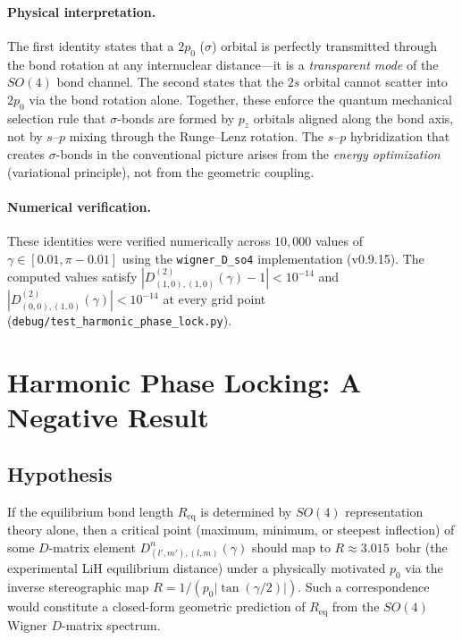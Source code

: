 \documentclass[aps,pra,twocolumn,superscriptaddress,longbibliography]{revtex4-2}
\begin{document}
\paragraph{Physical interpretation.}
The first identity states that a $2p_0$ ($\sigma$) orbital is perfectly
transmitted through the bond rotation at any internuclear distance---it is
a \emph{transparent mode} of the $SO(4)$ bond channel.  The second states
that the $2s$ orbital cannot scatter into $2p_0$ via the bond rotation
alone.  Together, these enforce the quantum mechanical selection rule that
$\sigma$-bonds are formed by $p_z$ orbitals aligned along the bond axis,
not by $s$--$p$ mixing through the Runge--Lenz rotation.  The $s$--$p$
hybridization that creates $\sigma$-bonds in the conventional picture
arises from the \emph{energy optimization} (variational principle), not
from the geometric coupling.

\paragraph{Numerical verification.}
These identities were verified numerically across $10{,}000$ values of
$\gamma \in [0.01, \pi - 0.01]$ using the \texttt{wigner\_D\_so4}
implementation (v0.9.15).  The computed values satisfy
$|D^{(2)}_{(1,0),(1,0)}(\gamma) - 1| < 10^{-14}$ and
$|D^{(2)}_{(0,0),(1,0)}(\gamma)| < 10^{-14}$ at every grid point
(\texttt{debug/test\_harmonic\_phase\_lock.py}).


\section{Harmonic Phase Locking: A Negative Result}
\label{sec:phase_lock}

\subsection{Hypothesis}

If the equilibrium bond length $R_{\text{eq}}$ is determined by $SO(4)$
representation theory alone, then a critical point (maximum, minimum, or
steepest inflection) of some $D$-matrix element
$D^n_{(l',m'),(l,m)}(\gamma)$ should map to $R \approx 3.015$~bohr
(the experimental LiH equilibrium distance) under a physically motivated
$p_0$ via the inverse stereographic map $R = 1/(p_0 |\tan(\gamma/2)|)$.
Such a correspondence would constitute a closed-form geometric prediction
of $R_{\text{eq}}$ from the $SO(4)$ Wigner $D$-matrix spectrum.
\end{document}
